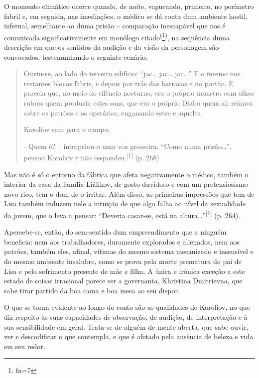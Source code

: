 \documentclass{article}
\makeatletter
\newcommand{\fn}{\afterassignment\fn@aux\count0=}
\newcommand{\fn@aux}{\csname fn\the\count0\endcsname}
\makeatother
\begin{document}
O momento climático ocorre quando, de noite, vagueando, primeiro, no perímetro
fabril e, em seguida, nas imediações, o médico se dá conta dum ambiente hostil,
infernal, semelhante ao duma prisão – comparação inescapável que nos é
comunicada significativamente em monólogo citado\textsuperscript{(}\footnote{\fn7}\textsuperscript{)}, na sequência duma descrição em que os sentidos da audição e da visão da
personagem são convocados, testemunhando o seguinte cenário:
\begin{quote}

Ouviu-se, ao lado do terceiro edifício: “jac… jac… jac…” E o mesmo nos restantes
blocos fabris, e depois por trás das barracas e no portão. E parecia que, no
meio do silêncio nocturno, era o próprio monstro com olhos rubros quem produzia
estes sons, que era o próprio Diabo quem ali reinava sobre os patrões e os
operários, enganando estes e aqueles.

Koroliov saiu para o campo.

- Quem é? – interpelou-o uma voz grosseira. “Como numa prisão…”, pensou Koroliov
e não respondeu.\textsuperscript{[}\textsuperscript{1}\textsuperscript{]}
(p. 268)

\end{quote}

Mas não é só o entorno da fábrica que afeta negativamente o médico, também o
interior da casa da família Liálikov, de gosto duvidoso e com um pretensiosismo
novo-rico, tem o dom de o irritar. Além disso, as primeiras impressões que tem
de Lisa também induzem nele a intuição de que algo falha ao nível da sexualidade
da jovem, que o leva a pensar: “Deveria casar-se, está na
altura…”\textsuperscript{[}\textsuperscript{1}\textsuperscript{]}
(p. 264).

Apercebe-se, então, do sem-sentido dum empreendimento que a ninguém beneficia:
nem aos trabalhadores, duramente explorados e alienados, nem aos patrões, também
eles, afinal, vítimas do mesmo sistema mecanizado e insensível e do mesmo
ambiente insalubre, como se prova pela morte prematura do pai de Lisa e pelo
sofrimento presente de mãe e filha. A única e irónica exceção a este estado de
coisas irracional parece ser a governanta, Khristina Dmitrievna, que sabe tirar
partido da boa cama e boa mesa ao seu dispor.

O que se torna evidente ao longo do conto são as qualidades de Koroliov, no que
diz respeito às suas capacidades de observação, de audição, de interpretação e à
sua sensibilidade em geral. Trata-se de alguém de mente aberta, que sabe ouvir,
ver e descodificar o que contempla, e que é afetado pela ausência de beleza e
vida em seu redor.
\end{document}
